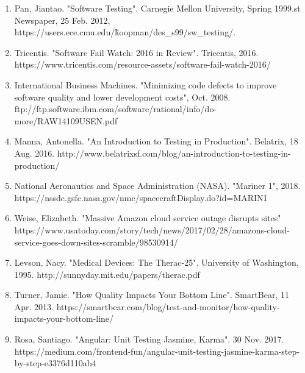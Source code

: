\documentclass[12pt]{report}
\begin{document}
\small
\begin{enumerate}
\item Pan, Jiantao. "Software Testing". Carnegie Mellon University, Spring 1999.st Newspaper, 25 Feb. 2012, https://users.ece.cmu.edu/\~koopman/des\_s99/sw\_testing/.

\item Tricentis. "Software Fail Watch: 2016 in Review". Tricentis, 2016. https://www.tricentis.com/resource-assets/software-fail-watch-2016/

\item International Business Machines. "Minimizing code defects to improve software quality and lower development costs", Oct. 2008. ftp://ftp.software.ibm.com/software/rational/info/do-more/RAW14109USEN.pdf

\item Manna, Antonella. "An Introduction to Testing in Production". Belatrix, 18 Aug. 2016. http://www.belatrixsf.com/blog/an-introduction-to-testing-in-production/

\item National Aeronautics and Space Administration (NASA). "Mariner 1", 2018. https://nssdc.gsfc.nasa.gov/nmc/spacecraftDisplay.do?id=MARIN1

\item Weise, Elizabeth. "Massive Amazon cloud service outage disrupts sites"
https://www.usatoday.com/story/tech/news/2017/02/28/amazons-cloud-service-goes-down-sites-scramble/98530914/

\item Levson, Nacy. "Medical Devices: The Therac-25". University of Washington, 1995. http://sunnyday.mit.edu/papers/therac.pdf

\item Turner, Jamie. "How Quality Impacts Your Bottom Line". SmartBear, 11 Apr. 2013. https://smartbear.com/blog/test-and-monitor/how-quality-impacts-your-bottom-line/

\item Rosa, Santiago. "Angular: Unit Testing Jasmine, Karma". 30 Nov. 2017. https://medium.com/frontend-fun/angular-unit-testing-jasmine-karma-step-by-step-e3376d110ab4
\end{enumerate}
\end{document}
